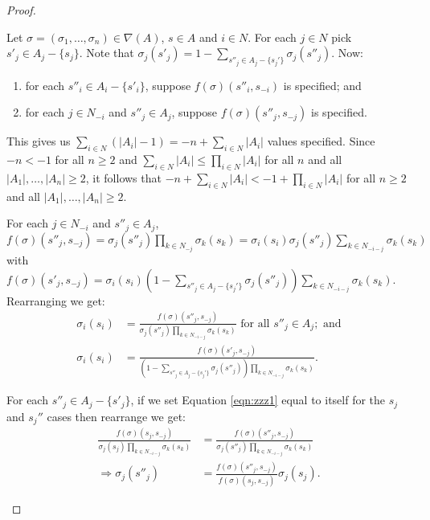 \begin{proposition}
\begin{proof}
\begin{enumerate}
				Let $\sigma = (\sigma_1, \ldots, \sigma_n) \in \nabla(A)$, $s \in A$ and $i \in N$. For each $j \in N$ pick $s'_j \in A_j-\{s_j\}$. Note that $\sigma_j(s'_j) = 1 - \sum_{s''_j \in A_j-\{s_j'\}}\sigma_j(s''_j)$. Now:
				\begin{enumerate}
					\item for each $s''_i \in A_i-\{s'_i\}$, suppose $f(\sigma)(s''_i, s_{-i})$ is specified; and 
					\item for each $j \in N_{-i}$ and $s''_j \in A_j$, suppose $f(\sigma)(s''_j, s_{-j})$ is specified.
				\end{enumerate}
				This gives us $\sum_{i \in N}\left(|A_i|-1\right) = -n + \sum_{i \in N}|A_i|$ values specified. Since $-n < -1$ for all $n \geq 2$ and $\sum_{i \in N}|A_i| \leq \prod_{i \in N}|A_i|$ for all $n$ and all $|A_1|, \ldots, |A_n| \geq 2$, it follows that $-n + \sum_{i \in N}|A_i| < -1 + \prod_{i \in N}|A_i|$ for all $n \geq 2$ and all $|A_1|, \ldots, |A_n| \geq 2$. 
				
				For each $j \in N_{-i}$ and $s''_j \in A_j$, $f(\sigma)(s''_j, s_{-j}) = \sigma_j(s''_j)\prod_{k \in N_{-j}}\sigma_k(s_k) = \sigma_i(s_i)\sigma_j(s''_j)\sum_{k \in N_{-i-j}}\sigma_k(s_k)$ with $f(\sigma)(s'_j, s_{-j}) = \sigma_i(s_i)\left(1 - \sum_{s''_j \in A_j-\{s_j'\}}\sigma_j(s''_j)\right)\sum_{k \in N_{-i-j}}\sigma_k(s_k)$. Rearranging we get:
				\begin{align}
					\sigma_i(s_i) &= \frac{f(\sigma)(s''_j, s_{-j})}{\sigma_j(s''_j)\prod_{k \in N_{-i-j}}\sigma_k(s_k)} \text{ for all } s''_j \in A_j; \text{ and} \label{eqn:zzz1} \\
					\sigma_i(s_i) &= \frac{f(\sigma)(s'_j, s_{-j})}{\left(1 - \sum_{s''_j \in A_j-\{s_j'\}}\sigma_j(s''_j)\right)\prod_{k \in N_{-i-j}}\sigma_k(s_k)}. \label{eqn:zzz2}
				\end{align}
				
				For each $s''_j \in A_j-\{s'_j\}$, if we set Equation \eqref{eqn:zzz1} equal to itself for the $s_j$ and $s_j''$ cases then rearrange we get:
				\begin{align}
					\frac{f(\sigma)(s_j, s_{-j})}{\sigma_j(s_j)\prod_{k \in N_{-i-j}}\sigma_k(s_k)} &= \frac{f(\sigma)(s''_j, s_{-j})}{\sigma_j(s''_j)\prod_{k \in N_{-i-j}}\sigma_k(s_k)} \nonumber\\
					\Rightarrow \sigma_j(s''_j) &= \frac{f(\sigma)(s''_j, s_{-j})}{f(\sigma)(s_j, s_{-j})}\sigma_j(s_j). \label{eqn:zzz3}
				\end{align}
				

\end{enumerate}
\end{proof}
\end{proposition}
